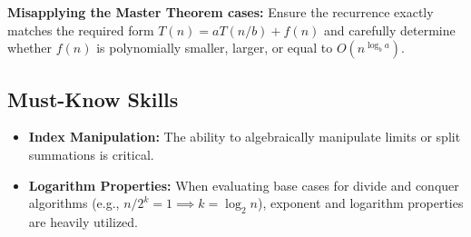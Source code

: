 \begin{remark}
\textbf{Misapplying the Master Theorem cases:} Ensure the recurrence exactly matches the required form $T(n) = aT(n/b) + f(n)$ and carefully determine whether $f(n)$ is polynomially smaller, larger, or equal to $O(n^{\log_b a})$.
\end{remark}

\subsection{Must-Know Skills}
\begin{itemize}
    \item \textbf{Index Manipulation:} The ability to algebraically manipulate limits or split summations is critical.
    \item \textbf{Logarithm Properties:} When evaluating base cases for divide and conquer algorithms (e.g., $n/2^k = 1 \implies k = \log_2 n$), exponent and logarithm properties are heavily utilized.
\end{itemize}
